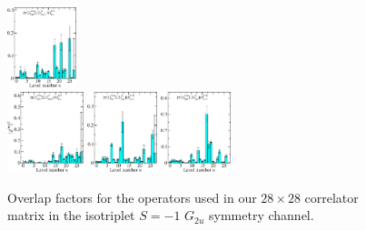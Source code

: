 \begin{figure}[H]
    \includegraphics[width=0.18\textwidth]{figures/sigmas/g2u/zfactors/zfactor_isotriplet_pion_sigma-G2u_1-P011-A2m-SS_0-P0-1-1-G-SS_17.pdf}\\[-0.2cm]
    \includegraphics[width=0.1975\textwidth]{figures/sigmas/g2u/zfactors/zfactor_isotriplet_pion_sigma-G2u_1-P011-A2m-SS_0-P0-1-1-G-SS_18.pdf}
    \includegraphics[width=0.18\textwidth]{figures/sigmas/g2u/zfactors/zfactor_isotriplet_pion_sigma-G2u_1-P011-A2m-SS_1-P0-1-1-G-SS_1.pdf}
    \includegraphics[width=0.18\textwidth]{figures/sigmas/g2u/zfactors/zfactor_isotriplet_pion_sigma-G2u_1-P111-A2m-SS_0-P-1-1-1-G-SS_4.pdf}
    \caption{Overlap factors for the operators used in our $28\times 28$ correlator matrix in the isotriplet $S=-1$ $G_{2u}$ symmetry channel.}\label{fig:g2u_zfactors}
\end{figure}

